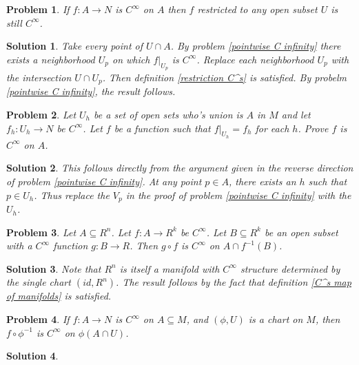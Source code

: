 \documentclass{article}
\theoremstyle{problemstyle}
\newtheorem{problem}{Problem}
\theoremstyle{problemstyle}
\newtheorem{solution}{Solution}
\theoremstyle{problemstyle}
\theoremstyle{problemstyle}
\theoremstyle{problemstyle}
\begin{document}
\begin{problem}
If $f:A \rightarrow N$ is $C^\infty$ on $A$ then $f$ restricted to any open subset $U$ is still $C^\infty$.
\end{problem}

\begin{solution}
Take every point of $U \cap A$. By problem \ref{pointwise C infinity} there exists a neighborhood $U_p$ on which $f|_{U_p}$ is $C^\infty$.  Replace each neighborhood $U_p$ with the intersection $U \cap U_p$. Then definition \ref{restriction C^s} is satisfied. By probelm \ref{pointwise C infinity}, the result follows. 
\end{solution}

\begin{problem}
Let $U_h$ be a set of open sets who's union is $A$ in $M$ and let $f_h:U_h \rightarrow N$ be $C^\infty$. Let $f$ be a function such that $f|_{U_h} = f_h$ for each $h$. Prove $f$ is $C^\infty$ on $A$. 
\end{problem}

\begin{solution}
This follows directly from the argument given in the reverse direction of problem \ref{pointwise C infinity}. At any point $p \in A$, there exists an $h$ such that $p \in U_h$. Thus replace the $V_p$ in the proof of problem \ref{pointwise C infinity} with the $U_h$.
\end{solution}

\begin{problem}
Let $A \subseteq R^n$. Let $f:A \rightarrow R^k$ be $C^\infty$. Let $B \subseteq R^k$ be an open subset with a $C^\infty$ function $g:B\rightarrow R$. Then $g \circ f$ is $C^\infty$ on $A \cap f^{-1}(B)$.   
\end{problem}

\begin{solution}
Note that $R^n$ is itself a manifold with $C^\infty$ structure determined by the single chart $(id,R^n)$. The result follows by the fact that definition \ref{C^s map of manifolds} is satisfied. 
\end{solution}

\begin{problem}
If $f:A \rightarrow N$ is $C^\infty$ on $A \subseteq M$, and $(\phi,U)$ is a chart on $M$, then $f \circ \phi^{-1}$ is $C^\infty$ on $\phi(A \cap U)$. 
\end{problem}

\begin{solution}

\end{solution}
\end{document}

